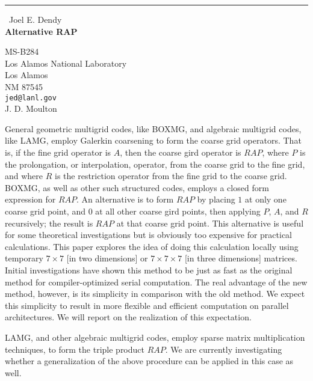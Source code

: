 \documentclass{report}
\begin{document}
\begin{center}
\rule{6in}{1pt} \
{\large Joel E. Dendy \\
{\bf Alternative RAP}}

MS-B284 \\ Los Alamos National Laboratory \\ Los Alamos \\ NM 87545
\\
{\tt jed@lanl.gov}\\
J. D. Moulton\end{center}

General geometric multigrid codes, like BOXMG, and algebraic
multigrid codes, like LAMG, employ Galerkin coarsening to form the
coarse grid operators. That is, if the fine grid operator is $A$,
then the coarse gird operator is $RAP$, where $P$ is the
prolongation, or interpolation, operator, from the coarse grid to
the fine grid, and where $R$ is the restriction operator from the
fine grid to the coarse grid. BOXMG, as well as other such
structured codes, employs a closed form expression for $RAP$. An
alternative is to form $RAP$ by placing $1$ at only one coarse grid
point, and $0$ at all other coarse gird points, then applying $P$,
$A$, and $R$ recursively; the result is $RAP$ at that coarse grid
point. This alternative is useful for some theoretical
investigations but is obviously too expensive for practical
calculations. This paper explores the idea of doing this calculation
locally using temporary $7\times7$ [in two dimensions] or
$7\times7\times7$ [in three dimensions] matrices. Initial
investigations have shown this method to be just as fast as the
original method for compiler-optimized serial computation. The real
advantage of the new method, however, is its simplicity in
comparison with the old method. We expect this simplicity to result
in more flexible and efficient computation on parallel architectures. We
will report on the realization of this expectation.

LAMG, and other algebraic multigrid codes, employ sparse matrix
multiplication techniques, to form the triple product $RAP$. We are
currently investigating whether a generalization of the above
procedure can be applied in this case as well.
\end{document}
